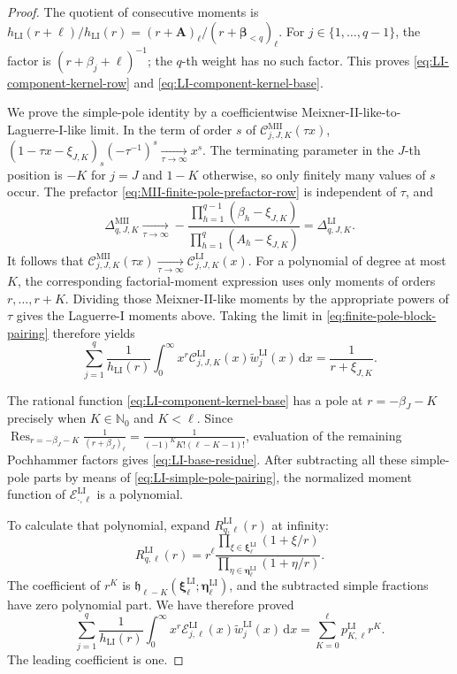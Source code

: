 \documentclass[10pt]{amsart}
\newcommand{\Nzero}{\mathbb N_0}
\newcommand{\dd}{\,\mathrm d}
\newcommand{\A}{\boldsymbol A}
\newcommand{\bbeta}{\boldsymbol\beta}
\DeclareMathOperator*{\Res}{Res}
\theoremstyle{plain}
\theoremstyle{definition}
\theoremstyle{remark}
\begin{document}
\begin{proof}
The quotient of consecutive moments is
\(h_{\mathrm{LI}}(r+\ell)/h_{\mathrm{LI}}(r)
=(r+\A)_\ell/(r+\bbeta_{<q})_\ell\).
For \(j\in\{1,\ldots,q-1\}\), the factor is
\((r+\beta_j+\ell)^{-1}\); the \(q\)-th weight has no such factor. This
proves \eqref{eq:LI-component-kernel-row} and
\eqref{eq:LI-component-kernel-base}.

We prove the simple-pole identity by a coefficientwise
Meixner-II-like-to-Laguerre-I-like limit. In the term of order \(s\) of
\(\mathcal C_{j,J,K}^{\mathrm{MII}}(\tau x)\),
\((1-\tau x-\xi_{J,K})_s(-\tau^{-1})^s
\xrightarrow[\tau\to\infty]{}x^s\).
The terminating parameter in the \(J\)-th position is \(-K\) for
\(j=J\) and \(1-K\) otherwise, so only finitely many values of \(s\)
occur. The prefactor
\eqref{eq:MII-finite-pole-prefactor-row} is independent of \(\tau\),
and
\[
 \Delta_{q,J,K}^{\mathrm{MII}}
 \xrightarrow[\tau\to\infty]{}
 -\frac{\prod_{h=1}^{q-1}(\beta_h-\xi_{J,K})}
       {\prod_{h=1}^{q}(A_h-\xi_{J,K})}
 =\Delta_{q,J,K}^{\mathrm{LI}}.
\]
It follows that
\(\mathcal C_{j,J,K}^{\mathrm{MII}}(\tau x)
\xrightarrow[\tau\to\infty]{}\mathcal C_{j,J,K}^{\mathrm{LI}}(x)\).
For a polynomial of degree at most \(K\), the corresponding
factorial-moment expression uses only moments of
orders \(r,\ldots,r+K\). Dividing those Meixner-II-like moments by
the appropriate powers of \(\tau\) gives the Laguerre-I moments above.
Taking the limit in \eqref{eq:finite-pole-block-pairing} therefore yields
\begin{equation}
 \sum_{j=1}^q\frac1{h_{\mathrm{LI}}(r)}
 \int_0^\infty x^r
 \mathcal C_{j,J,K}^{\mathrm{LI}}(x)
 \widetilde w_j^{\mathrm{LI}}(x)\dd x
 =\frac1{r+\xi_{J,K}}.
 \label{eq:LI-simple-pole-pairing}
\end{equation}

The rational function
\eqref{eq:LI-component-kernel-base} has a pole at
\(r=-\beta_J-K\) precisely when \(K\in\Nzero\) and \(K<\ell\). Since
\(\Res_{r=-\beta_J-K}\frac1{(r+\beta_J)_\ell}
=\frac1{(-1)^K K!(\ell-K-1)!}\),
evaluation of the remaining Pochhammer factors gives
\eqref{eq:LI-base-residue}.  After subtracting all these simple-pole
parts by means of \eqref{eq:LI-simple-pole-pairing}, the normalized moment
function of \(\mathcal E_{\cdot,\ell}^{\mathrm{LI}}\) is a polynomial.

To calculate that polynomial, expand \(R_{q,\ell}^{\mathrm{LI}}(r)\) at
infinity:
\[
 R_{q,\ell}^{\mathrm{LI}}(r)
 =r^\ell
 \frac{\prod_{\xi\in\boldsymbol\xi_\ell^{\mathrm{LI}}}
       (1+\xi/r)}
      {\prod_{\eta\in\boldsymbol\eta_\ell^{\mathrm{LI}}}
       (1+\eta/r)}.
\]
The coefficient of \(r^K\) is
\(\mathfrak h_{\ell-K}
(\boldsymbol\xi_\ell^{\mathrm{LI}};
 \boldsymbol\eta_\ell^{\mathrm{LI}})\), and the subtracted simple
fractions have zero polynomial part.  We have therefore proved
\begin{equation}
 \sum_{j=1}^q\frac1{h_{\mathrm{LI}}(r)}
 \int_0^\infty x^r
 \mathcal E_{j,\ell}^{\mathrm{LI}}(x)
 \widetilde w_j^{\mathrm{LI}}(x)\dd x
 =\sum_{K=0}^{\ell}p_{K,\ell}^{\mathrm{LI}}r^K.
 \label{eq:LI-polynomial-pairing}
\end{equation}
The leading coefficient is one.


\end{proof}
\end{document}
